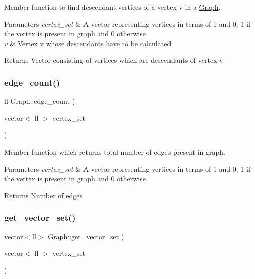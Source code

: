 Member function to find descendant vertices of a vertex v in a \hyperlink{classGraph}{Graph}. 


\begin{DoxyParams}{Parameters}
{\em vertex\+\_\+set} & A vector representing vertices in terms of 1 and 0, 1 if the vertex is present in graph and 0 otherwise \\
\hline
{\em v} & Vertex v whose descendants have to be calculated \\
\hline
\end{DoxyParams}
\begin{DoxyReturn}{Returns}
Vector consisting of vertices which are descendants of vertex v 
\end{DoxyReturn}
\mbox{\label{classGraph_ac63411364245eb9ae4009429a38621f7}} 
\subsubsection{\texorpdfstring{edge\+\_\+count()}{edge\_count()}}
{\footnotesize\ttfamily ll Graph\+::edge\+\_\+count (\begin{DoxyParamCaption}\item[{vector$<$ ll $>$}]{vertex\+\_\+set }\end{DoxyParamCaption})\hspace{0.3cm}{\ttfamily [inline]}}



Member function which returns total number of edges present in graph. 


\begin{DoxyParams}{Parameters}
{\em vertex\+\_\+set} & A vector representing vertices in terms of 1 and 0, 1 if the vertex is present in graph and 0 otherwise \\
\hline
\end{DoxyParams}
\begin{DoxyReturn}{Returns}
Number of edges 
\end{DoxyReturn}
\mbox{\label{classGraph_ab374b601113c5afe1d6d81c72ccb1fa4}} 
\subsubsection{\texorpdfstring{get\+\_\+vector\+\_\+set()}{get\_vector\_set()}}
{\footnotesize\ttfamily vector$<$ll$>$ Graph\+::get\+\_\+vector\+\_\+set (\begin{DoxyParamCaption}\item[{vector$<$ ll $>$}]{vertex\+\_\+set }\end{DoxyParamCaption})\hspace{0.3cm}{\ttfamily [inline]}}



